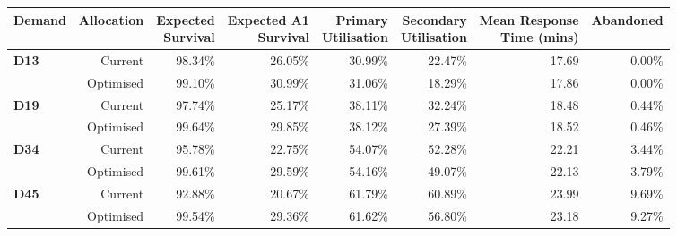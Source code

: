 \begin{tabular}{lrrrrrrr}
\toprule
Demand & Allocation & \specialcellr{Expected\\Survival} & \specialcellr{Expected A1\\Survival} & \specialcellr{Primary\\Utilisation} & \specialcellr{Secondary\\Utilisation} & \specialcellr{Mean Response\\Time (mins)} & Abandoned \\
\midrule
\multirow{2}{*}{\textbf{D13}} & Current   & 98.34\% & 26.05\% & 30.99\% & 22.47\% & 17.69 & 0.00\% \\
                              & Optimised & 99.10\% & 30.99\% & 31.06\% & 18.29\% & 17.86 & 0.00\% \\
\midrule
\multirow{2}{*}{\textbf{D19}} & Current   & 97.74\% & 25.17\% & 38.11\% & 32.24\% & 18.48 & 0.44\% \\
                              & Optimised & 99.64\% & 29.85\% & 38.12\% & 27.39\% & 18.52 & 0.46\% \\
\midrule
\multirow{2}{*}{\textbf{D34}} & Current   & 95.78\% & 22.75\% & 54.07\% & 52.28\% & 22.21 & 3.44\% \\
                              & Optimised & 99.61\% & 29.59\% & 54.16\% & 49.07\% & 22.13 & 3.79\% \\
\midrule
\multirow{2}{*}{\textbf{D45}} & Current   & 92.88\% & 20.67\% & 61.79\% & 60.89\% & 23.99 & 9.69\% \\
                              & Optimised & 99.54\% & 29.36\% & 61.62\% & 56.80\% & 23.18 & 9.27\% \\
\bottomrule
\end{tabular}
